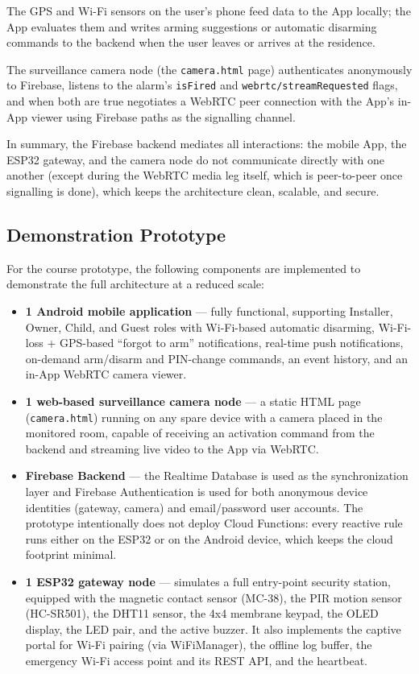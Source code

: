 \documentclass[10pt,twocolumn]{article}
\begin{document}
The GPS and Wi-Fi sensors on the user's phone feed data to the App locally; the App evaluates them and writes arming suggestions or automatic disarming commands to the backend when the user leaves or arrives at the residence.

The surveillance camera node (the \texttt{camera.html} page) authenticates anonymously to Firebase, listens to the alarm's \texttt{isFired} and \texttt{webrtc/streamRequested} flags, and when both are true negotiates a WebRTC peer connection with the App's in-App viewer using Firebase paths as the signalling channel.

In summary, the Firebase backend mediates all interactions: the mobile App, the ESP32 gateway, and the camera node do not communicate directly with one another (except during the WebRTC media leg itself, which is peer-to-peer once signalling is done), which keeps the architecture clean, scalable, and secure.

\subsection{Demonstration Prototype}
For the course prototype, the following components are implemented to demonstrate the full architecture at a reduced scale:
\begin{itemize}
    \item \textbf{1 Android mobile application} --- fully functional, supporting Installer, Owner, Child, and Guest roles with Wi-Fi-based automatic disarming, Wi-Fi-loss + GPS-based ``forgot to arm'' notifications, real-time push notifications, on-demand arm/disarm and PIN-change commands, an event history, and an in-App WebRTC camera viewer.
    \item \textbf{1 web-based surveillance camera node} --- a static HTML page (\texttt{camera.html}) running on any spare device with a camera placed in the monitored room, capable of receiving an activation command from the backend and streaming live video to the App via WebRTC.
    \item \textbf{Firebase Backend} --- the Realtime Database is used as the synchronization layer and Firebase Authentication is used for both anonymous device identities (gateway, camera) and email/password user accounts. The prototype intentionally does not deploy Cloud Functions: every reactive rule runs either on the ESP32 or on the Android device, which keeps the cloud footprint minimal.
    \item \textbf{1 ESP32 gateway node} --- simulates a full entry-point security station, equipped with the magnetic contact sensor (MC-38), the PIR motion sensor (HC-SR501), the DHT11 sensor, the 4x4 membrane keypad, the OLED display, the LED pair, and the active buzzer. It also implements the captive portal for Wi-Fi pairing (via WiFiManager), the offline log buffer, the emergency Wi-Fi access point and its REST API, and the heartbeat.
\end{itemize}
\end{document}
